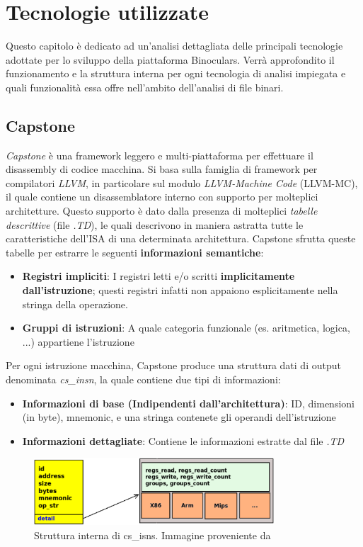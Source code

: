 \documentclass[../main.tex]{subfiles}
\begin{document}
\chapter{Tecnologie utilizzate}
\label{chap:conclusion}
Questo capitolo è dedicato ad un'analisi dettagliata delle principali tecnologie adottate per lo sviluppo della piattaforma Binoculars.
Verrà approfondito il funzionamento e la struttura interna per ogni tecnologia di analisi impiegata e quali funzionalità essa offre nell'ambito dell'analisi di
file binari.
\section{Capstone}
\textit{Capstone} \cite{Capstone_docs} è una framework leggero e multi-piattaforma per effettuare il disassembly di codice macchina.
Si basa sulla famiglia di framework per compilatori \textit{LLVM}, in particolare sul modulo \textit{LLVM-Machine Code} (LLVM-MC), il quale contiene un disassemblatore interno con supporto
per molteplici architetture. Questo supporto è dato dalla presenza di molteplici \textit{tabelle descrittive} (file \textit{.TD}), le quali descrivono in maniera astratta tutte le caratteristiche
dell'ISA di una determinata architettura. 
Capstone sfrutta queste tabelle per estrarre le seguenti \textbf{informazioni semantiche}:
\begin{itemize}
    \item \textbf{Registri impliciti}: I registri letti e/o scritti \textbf{implicitamente dall'istruzione}; questi registri infatti non appaiono esplicitamente nella stringa della operazione.
    \item \textbf{Gruppi di istruzioni}: A quale categoria funzionale (es. aritmetica, logica, ...) appartiene l'istruzione
\end{itemize}
Per ogni istruzione macchina, Capstone produce una struttura dati di output denominata \textit{cs\_insn}, la quale contiene due tipi di informazioni:
\begin{itemize}
    \item \textbf{Informazioni di base (Indipendenti dall'architettura)}: ID, dimensioni (in byte), mnemonic, e una stringa contenete gli operandi dell'istruzione
    \item \textbf{Informazioni dettagliate}: Contiene le informazioni estratte dal file \textit{.TD}
\end{itemize} 
\begin{figure}[H]
    \centering
    \includegraphics[width = 0.80\textwidth]{../images/cs_isns.png}
    \caption{Struttura interna di cs\_isns. Immagine proveniente da \cite{Capstone_docs}}
\end{figure}
\end{document}
